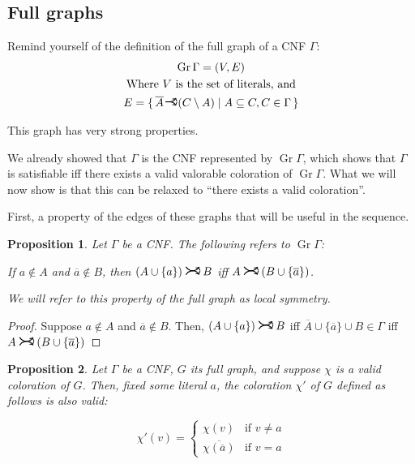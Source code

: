 \documentclass[11pt]{article}
\newcommand{\conj}[1]{\overline{#1}}
\DeclareMathOperator{\Gr}{Gr}
\newcommand{\rightcurvearrow}{
\mathrel{
  \begin{tikzpicture}[scale=0.8]
    \draw[thick,->] (0,1ex) arc (30:150:-2ex);
    \draw[thick,->] (0,-1ex) arc (150:30:2ex);
  \end{tikzpicture}
}
}
\newcommand{\rightcurveor}{
\!
\mathrel{
  \begin{tikzpicture}[scale=0.8]
    \draw[thick,->] (0,0) arc (90:150:-2ex);
    \draw[thick,->] (0,0) arc (90:30:2ex);
    \draw[thick] (-1ex, 0) -- (0.1ex,0);
  \end{tikzpicture}
}\!
}
\newtheorem{prop}{Proposition}
\begin{document}
\subsection{Full graphs}

Remind yourself of the definition of the full graph of a CNF $\Gamma$:
\begin{gather*}
\Gr \Gamma = (V,E) \\
\text{Where $V$ is the set of literals, and}\\
E = \{ \, \conj A \rightcurveor (C \setminus A) \mid A \subseteq C, C \in \Gamma \, \}
\end{gather*}

This graph has very strong properties.

We already showed that $\Gamma$ is the CNF represented by $\Gr \Gamma$, which shows that $\Gamma$ is satisfiable iff there exists a valid valorable coloration of $\Gr \Gamma$. What we will now show is that this can be relaxed to ``there exists a valid coloration''.

First, a property of the edges of these graphs that will be useful in the sequence.

\begin{prop}
Let $\Gamma$ be a CNF. The following refers to $\Gr \Gamma$:

If $a \not\in A$ and $\conj a \not\in B$, then $(A \cup \{a\}) \rightcurvearrow B$ iff $A \rightcurvearrow (B \cup \{\conj a\})$.

We will refer to this property of the full graph as \emph{local symmetry}.
\end{prop}

\begin{proof}
Suppose $a \not\in A$ and $\conj a \not\in B$. Then, $(A \cup \{a\}) \rightcurvearrow B$ iff $\conj A \cup \{\conj a\} \cup B \in \Gamma$ iff $A \rightcurvearrow (B \cup \{\conj a\})$
\end{proof}

\begin{prop} \label{swapvalue}
Let $\Gamma$ be a CNF, $G$ its full graph, and suppose $\chi$ is a valid coloration of $G$. Then, fixed some literal $a$, the coloration $\chi'$ of $G$ defined as follows is also valid:

\[
\chi'(v) =
\begin{cases}
\chi(v) & \text{if $v \neq a$}\\
\conj{\chi(\conj a)} & \text{if $v = a$}
\end{cases}
\]
\end{prop}
\end{document}
